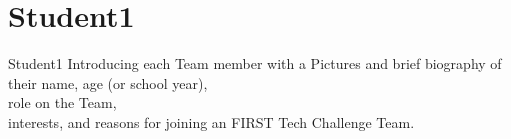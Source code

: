 \section {Student1}
Student1 Introducing each Team member with a Pictures and  brief  biography of their name, age (or school year),\\ role on the Team,\\ interests, and reasons for joining an FIRST Tech Challenge Team. \\